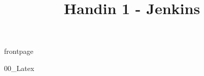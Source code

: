 \documentclass[a4paper]{article}								%
\title{Handin 1 - Jenkins}
\begin{document}

	{frontpage}

	
	{00_Latex} \newpage


\end{document}
